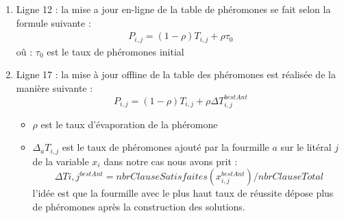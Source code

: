 \begin{enumerate}
			
		
		
		
		\item Ligne 12 : la mise a jour en-ligne de la table de phéromones se fait selon la formule suivante : 
		\begin{eqnarray}
		P_{i,j} = (1-\rho)T_{i,j} + \rho \tau_0
		\end{eqnarray}
		oû : 
		$\tau_0$ est le taux de phéromones initial
		\item Ligne 17 : la mise à jour offline de la table des phéromones est réalisée de la manière suivante : 
		\begin{equation*}
			P_{i,j} = (1-\rho)T_{i,j} + \rho \Delta T_{i,j}^{bestAnt}
		\end{equation*}
		\begin{itemize}
			\item $\rho$ est le taux d'évaporation de la phéromone
			\item $\Delta_a T_{i,j}$ est le taux de phéromones ajouté par la fourmille $a$ sur le litéral $j$ de la variable $x_i$
			dans notre cas nous avons prit : \\
			\begin{equation}
			\Delta T{i,j}^{bestAnt} = nbrClauseSatisfaites(x_{i,j}^{bestAnt})/nbrClauseTotal
			\end{equation}
			l'idée est que la fourmille avec le plus haut taux de réussite dépose plus de phéromones après la construction des solutions.
		\end{itemize}
	\end{enumerate}
	\newpage
